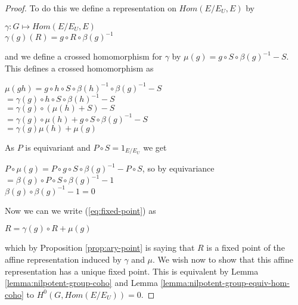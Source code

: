 \begin{proof}
    To do this we define a representation on $Hom(E/E_U, E)$ by
    \begin{center}
        $\gamma : G \mapsto Hom(E/E_U, E)$\\
        $\gamma(g)(R) = g\circ R \circ \beta(g)^{-1}$
    \end{center}
    and we define a crossed homomorphism for $\gamma$ by $\mu(g) = g\circ S \circ \beta(g)^{-1} - S$. This
    defines a crossed homomorphism  as
    \begin{center}
        $\mu(gh) = g \circ h\circ S \circ \beta(h)^{-1}\circ \beta(g)^{-1} -S$\\
        $ = \gamma(g)\circ h\circ S \circ \beta(h)^{-1} - S$\\
        $ = \gamma(g)\circ (\mu(h) + S) - S$\\
        $ = \gamma(g)\circ \mu(h) + g\circ S\circ \beta(g)^{-1} -S$\\
        $ = \gamma(g)\mu(h) + \mu(g)$
    \end{center}
    As $P$ is equivariant and $P \circ S = 1_{E/E_U}$ we get
    \begin{center}
        $P \circ \mu(g) =  P \circ g \circ S \circ \beta(g)^{-1} - P \circ S$, so by equivariance\\
        $ =  \beta(g) \circ P  \circ S \circ \beta(g)^{-1} - 1$\\
        $ \beta(g) \circ \beta(g)^{-1} - 1 = 0$
    \end{center}
    Now we can we write (\ref{eq:fixed-point}) as
    \begin{center}
        $R = \gamma(g)\circ R + \mu(g)$
    \end{center}
    which by Proposition \ref{prop:ary-point} is saying that $R$ is a fixed point of the affine representation
    induced by $\gamma$ and $\mu$. We wish now to show that this affine representation has a unique fixed point.
    This is equivalent by Lemma \ref{lemma:nilpotent-group-coho} and Lemma \ref{lemma:nilpotent-group-equiv-hom-coho}
    to $H^{0}(G, Hom(E/E_U)) = 0$.


\end{proof}
